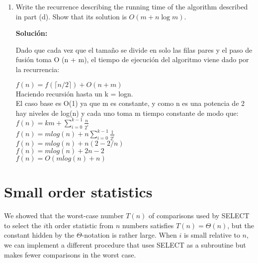 \documentclass{article}
\begin{document}
\begin{enumerate}[label=\textbf{\alph*.}]
  \item Write the recurrence describing the running time of the algorithm described in part (d). Show that its solution is $O(m+n\log m)$.
  
  \textbf{Solución:}
  
  Dado que cada vez que el tamaño se divide en solo las filas pares y el paso de fusión toma O (n + m), el tiempo de ejecución del algoritmo viene dado por la recurrencia:
  
  $f(n) = f(\lceil n/2 \rceil) + O(n+m)$\\
  Haciendo recursión hasta un k = logn.\\
  El caso base es O(1) ya que m es constante, y como n es una potencia de 2 hay niveles de log(n) y cada uno toma m tiempo constante de modo que:\\
  $f(n) = km + \sum_{i=0}^{k-1} \frac{n}{2^i}$\\
  $f(n) = mlog(n) + n \sum_{i=0}^{k-1} \frac{1}{2^i}$\\
  $f(n) = mlog(n) + n (2-2/n)$\\
  $f(n) = mlog(n) + 2n - 2$\\
  $f(n) = O(mlog(n) +n)$\\
  
\end{enumerate}

\section{Small order statistics}
We showed that the worst-case number $T(n)$ of comparisons used by SELECT to select the $i$th order statistic from $n$ numbers satisfies $T(n) = \Theta(n)$, but the constant hidden by the $\Theta$-notation is rather large. When $i$ is small relative to $n$, we can implement a different procedure that uses SELECT as a subroutine but makes fewer comparisons in the worst case.
\end{document}
